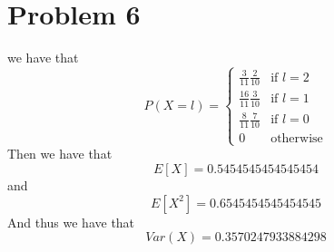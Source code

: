 \section*{Problem 6} 
we have that 
$$P(X=l)=\begin{cases}
    \frac{3}{11}\frac{2}{10} & \text{if } l=2\\
    \frac{16}{11}\frac{3}{10} & \text{if } l=1\\
    \frac{8}{11}\frac{7}{10} & \text{if } l=0\\
    0 & \text{otherwise}
\end{cases}$$
Then we have that 
$$E[X]=0.5454545454545454$$
and
$$E[X^2]=0.6545454545454545$$
And thus we have that 
$$Var(X)=\boxed{0.3570247933884298}$$



